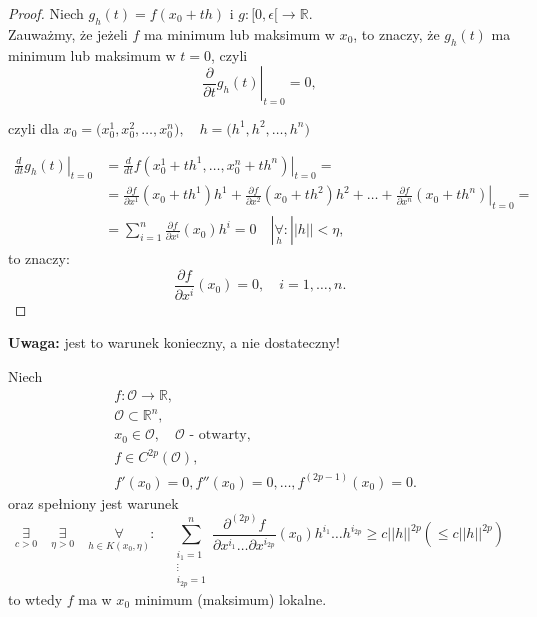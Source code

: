 \documentclass[../main.tex]{subfiles}
\begin{document}
\begin{proof}

Niech $g_h (t) = f(x_0+th) \text{ i } g: [0,\epsilon [ \to \mathbb{R}$.\\
Zauważmy, że jeżeli $f$ ma minimum lub maksimum w $x_0$, to znaczy, że $g_h (t)$ ma minimum lub maksimum w $t = 0$, czyli
\[
    \left . \frac{\partial}{\partial t} g_h(t) \right |_{t=0} = 0,
\]

czyli dla $x_0 = \big ( x_0^1, x_0^2, \dots, x_0^n),\quad h = \big ( h^1, h^2, \dots, h^n)$

\begin{align*}
    \left . \frac{d}{dt} g_h (t) \right |_{t=0} &= \left .\frac{d}{dt} f(x_0^1 + th^1, \dots, x_0^n + th^n) \right |_{t=0} = \\
&= \frac{\partial f}{\partial x^1} (x_0 + th^1) h^1 + \frac{\partial f}{\partial x^2} (x_0 + th^2) h^2 + \dots + \left .\frac{\partial f}{\partial x^n} (x_0 + th^n) \right |_{t=0}=\\
&=\sum_{i=1}^n \frac{\partial f}{\partial x^i} (x_0) h^i = 0 \quad |\underset{h}{\forall}: ||h|| < \eta
,\end{align*}
to znaczy:
\[
    \frac{\partial f}{\partial x^i} (x_0) = 0,\quad i = 1,\dots,n.
\]
\end{proof}
\textbf{Uwaga: } jest to warunek konieczny, a nie dostateczny!

\pagebreak
\begin{tw}
Niech
\begin{align*}
    &f: \mathcal{O} \to \mathbb{R},\\
    &\mathcal{O}\subset\mathbb{R}^n,\\
    &x_0\in\mathcal{O}, \quad \mathcal{O} \text{ - otwarty},\\
    &f \in C^{2p} (\mathcal{O}),\\
    &f'(x_0) = 0, f''(x_0) = 0,\dots,f^{(2p-1)} (x_0) = 0
.\end{align*}
oraz spełniony jest warunek
    \[
        \underset{c > 0}{\exists} \quad\underset{\eta > 0}{\exists} \quad\underset{h\in K(x_0,\eta)}{\forall}: \quad \sum_{\substack{i_1 = 1\\ \vdots \\ i_{2p} = 1}}^n \frac{\partial^{(2p)} f}{\partial x^{i_1} \dots \partial x^{i_{2p}}} (x_0) h^{i_1} \dots h^{i_{2p}} \geq c ||h||^{2p} (\leq c||h||^{2p})
    \]
to wtedy $f$ ma w $x_0$ minimum (maksimum) lokalne.
\end{tw}
\end{document}

